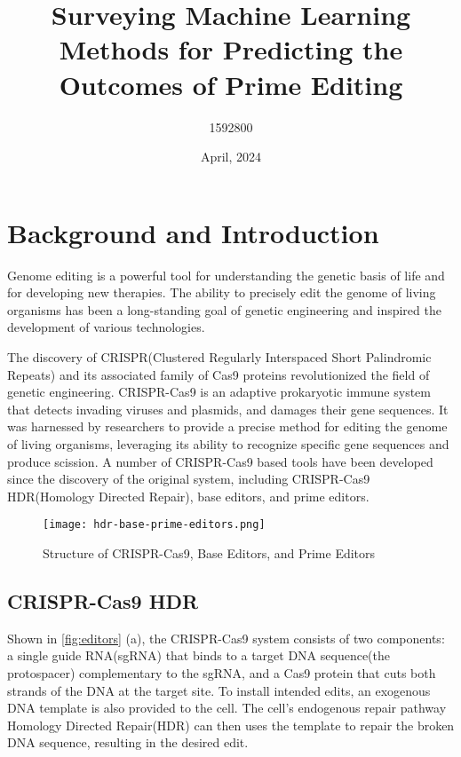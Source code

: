 \documentclass[12pt]{article}
\title{Surveying Machine Learning Methods for Predicting the Outcomes of \newline Prime Editing}
\author{1592800}
\begin{document}
\date{April, 2024}
\maketitle


\newpage



\tableofcontents



\newpage


\section{Background and Introduction}

Genome editing is a powerful tool for understanding the genetic basis of life and for developing new therapies. The ability to precisely edit the genome of living organisms has been a long-standing goal of genetic engineering and inspired the development of various technologies. 

The discovery of CRISPR(Clustered Regularly Interspaced Short Palindromic Repeats) and its associated family of Cas9 proteins revolutionized the field of genetic engineering. CRISPR-Cas9 is an adaptive prokaryotic immune system that detects invading viruses and plasmids, and damages their gene sequences. It was harnessed by researchers to provide a precise method for editing the genome of living organisms, leveraging its ability to recognize specific gene sequences and produce scission\cite{jiangCRISPRCas9Structures2017}. A number of CRISPR-Cas9 based tools have been developed since the discovery of the original system, including CRISPR-Cas9 HDR(Homology Directed Repair), base editors, and prime editors.

\begin{figure}[ht]
    \centering
    \texttt{[image: hdr-base-prime-editors.png]}
    \caption{Structure of CRISPR-Cas9, Base Editors, and Prime Editors\cite{liuPrimeEditingPrecise2023}}
    \label{fig:editors}
\end{figure}

\subsection{CRISPR-Cas9 HDR}


Shown in \autoref{fig:editors} (a), the CRISPR-Cas9 system consists of two components: a single guide RNA(sgRNA) that binds to a target DNA sequence(the protospacer) complementary to the sgRNA, and a Cas9 protein that cuts both strands of the DNA at the target site. To install intended edits, an exogenous DNA template is also provided to the cell. The cell's endogenous repair pathway Homology Directed Repair(HDR) can then uses the template to repair the broken DNA sequence, resulting in the desired edit.
\end{document}
